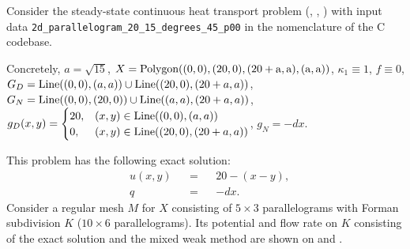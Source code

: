 \begin{example}
  \label{idec/diffusion/continuous/steady_state/examples/2d_parallelogram_20_15_degrees_45_p00-example}
  Consider the steady-state continuous heat transport problem
  (,
   ,
   )
  with input data \verb|2d_parallelogram_20_15_degrees_45_p00| in the nomenclature of the C codebase.

  Concretely,
    $a = \sqrt{15}$,
    $X = {\rm Polygon((0, 0), (20, 0), (20 + a, a), (a, a))}$,
    $\kappa_1 \equiv 1$,
    $f \equiv 0$,
    $G_D = {\rm Line}((0, 0), (a, a)) \cup {\rm Line}((20, 0), (20 + a, a))$,
    $G_N = {\rm Line}((0, 0), (20, 0)) \cup {\rm Line}((a, a), (20 + a, a))$,
    $g_D(x, y) =
      \begin{cases}
        20, & (x, y) \in {\rm Line}((0, 0), (a, a)) \\
        0,  & (x, y) \in {\rm Line}((20, 0), (20 + a, a))
      \end{cases}
    $,
    $g_N = - d x$.

  This problem has the following exact solution:
  \begin{subequations}
    \begin{alignat}{3}
      & u(x, y) && = && 20 - (x - y), \\
      & q && = && - d x.
    \end{alignat}
  \end{subequations}
  Consider a regular mesh $M$ for $X$ consisting of $5 \times 3$ parallelograms
  with Forman subdivision $K$ ($10 \times 6$ parallelograms).
  Its potential and flow rate on $K$ consisting of the exact solution and the
  mixed weak method are shown on
  and
  .
\end{example}
